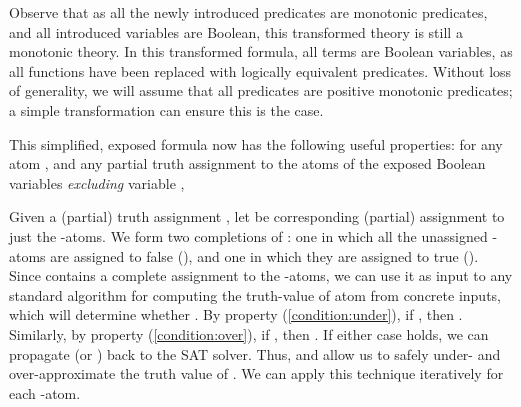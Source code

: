 \documentclass[runningheads]{llncs}
\begin{document}
Observe that as all the newly introduced predicates are monotonic predicates, and all introduced variables are Boolean, this transformed theory is still a monotonic theory. In this transformed formula, all terms are Boolean variables, as all functions have been replaced with logically equivalent predicates. Without loss of generality, we will assume that all predicates are positive monotonic predicates; a simple transformation can ensure this is the case.

This simplified, exposed formula now has the following useful properties: for any atom , and any partial truth assignment  to the atoms of the exposed Boolean variables  \textit{excluding} variable ,








Given a (partial) truth assignment , let  be corresponding (partial) assignment to just the -atoms. We form two
completions of : one in which all the unassigned -atoms
are assigned to false (),
and one in which they are assigned to true (). Since  contains
a complete assignment to the -atoms, we can use it as input to any standard algorithm
for computing the truth-value of atom  from concrete inputs, which will determine
whether . By property (\ref{condition:under}), if , then .  Similarly,
by property (\ref{condition:over}), if
, then . If either case holds,
we can propagate  (or ) back to the SAT solver. Thus,
 and  allow us to safely under- and over-approximate the truth value of
. We can apply this technique iteratively for each -atom.
\end{document}
